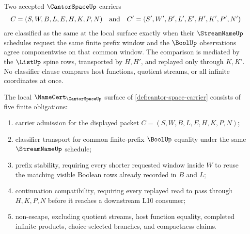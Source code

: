 \begin{definition}
\label{def:cantor-space-classifier}
Two accepted $\CantorSpaceUp$ carriers
$$
C=(S,W,B,L,E,H,K,P,N)
\quad\hbox{and}\quad
C'=(S',W',B',L',E',H',K',P',N')
$$
are classified as the same at the local surface exactly when their
$\StreamNameUp$ schedules request the same finite prefix window and the
$\BoolUp$ observations agree componentwise on that common window. The
comparison is mediated by the $\ListUp$ spine rows, transported by $H,H'$, and
replayed only through $K,K'$. No classifier clause compares host functions,
quotient streams, or all infinite coordinates at once.
\end{definition}

\begin{theorem}
\label{thm:cantor-space-namecert-obligation-surface}
The local $\NameCert_{\CantorSpaceUp}$ surface of
\autoref{def:cantor-space-carrier} consists of five finite obligations:
\begin{enumerate}
\item carrier admission for the displayed packet
$C=(S,W,B,L,E,H,K,P,N)$;
\item classifier transport for common finite-prefix $\BoolUp$ equality under
the same $\StreamNameUp$ schedule;
\item prefix stability, requiring every shorter requested window inside $W$ to
reuse the matching visible Boolean rows already recorded in $B$ and $L$;
\item continuation compatibility, requiring every replayed read to pass
through $H,K,P,N$ before it reaches a downstream L10 consumer;
\item non-escape, excluding quotient streams, host function equality,
completed infinite products, choice-selected branches, and compactness claims.
\end{enumerate}
\end{theorem}
